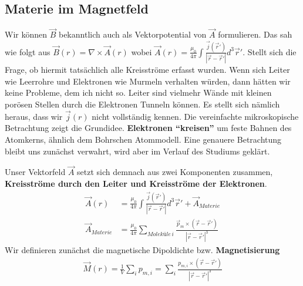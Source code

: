 \subsection{Materie im Magnetfeld}
Wir können $\vec{B}$ bekanntlich auch als Vektorpotential von $\vec{A}$ formulieren. Das sah wie folgt aus $\vec{B}(r) = \nabla \times \vec{A}(r)$ wobei $\vec{A}(r) = \frac{\mu_0}{4\pi} \int \frac{\vec{j}(\vec{r}')}{|\vec{r}-\vec{r}'|} d^3 \vec{r}' $.
Stellt sich die Frage, ob hiermit tatsächlich alle Kreisströme erfasst wurden. Wenn sich Leiter wie Leerrohre und Elektronen wie Murmeln verhalten würden, dann hätten wir keine Probleme, dem ich nicht so. Leiter sind vielmehr Wände mit kleinen porösen Stellen durch die Elektronen Tunneln können. 
Es stellt sich nämlich heraus, dass wir $\vec{j}(r)$ nicht vollständig kennen.
Die vereinfachte mikroskopische Betrachtung zeigt die Grundidee. \textbf{Elektronen "`kreisen"'} um feste Bahnen des Atomkerns, ähnlich dem Bohrschen Atommodell. Eine genauere Betrachtung bleibt uns zunächst verwahrt, wird aber im Verlauf des Studiums geklärt. \par
Unser Vektorfeld $\vec{A}$ setzt sich demnach aus zwei Komponenten zusammen, \textbf{Kreisströme durch den Leiter und Kreisströme der Elektronen}. 
\begin{align*}
\vec{A}(r) &= \frac{\mu_0}{4\pi} \int \frac{\vec{j}(\vec{r}')}{|\vec{r}-\vec{r}'|} d^3 \vec{r}'  + \vec{A}_{Materie} \\
\vec{A}_{Materie} &= \frac{\mu_0}{4\pi} \sum\limits_{Moleküle \, i} \frac{\vec{p}_m \times \left(    \vec{r}-\vec{r}' \right)}{|\vec{r}-\vec{r}'|^3}
\end{align*}
Wir definieren zunächst die magnetische Dipoldichte bzw. \textbf{Magnetisierung}\begin{align} \label{eqn:Magnetisierung}
\vec{M}(r) = \frac{1}{V} \sum\limits_i p_{m,i} =  \sum\limits_i  \frac{p_{m,i} \times \left(    \vec{r}-\vec{r}' \right) }{|\vec{r}-\vec{r}'|^3}
\end{align}

